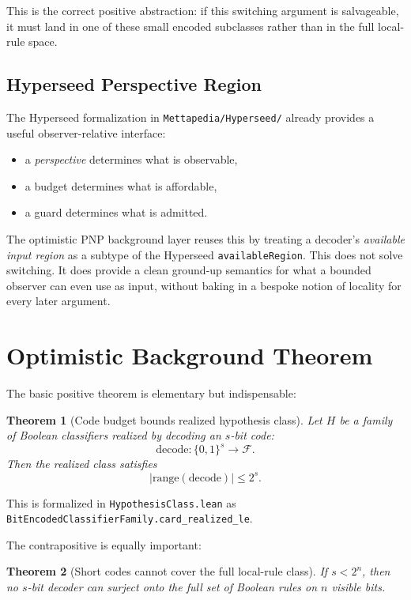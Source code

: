 \documentclass[11pt]{article}
\newtheorem{theorem}{Theorem}[section]
\theoremstyle{remark}
\begin{document}
This is the correct positive abstraction: if this switching argument is salvageable, it must
land in one of these small encoded subclasses rather than in the full local-rule space.

\subsection{Hyperseed Perspective Region}

The Hyperseed formalization in \texttt{Mettapedia/Hyperseed/} already provides a useful
observer-relative interface:
\begin{itemize}[leftmargin=1.5em]
  \item a \emph{perspective} determines what is observable,
  \item a budget determines what is affordable,
  \item a guard determines what is admitted.
\end{itemize}

The optimistic PNP background layer reuses this by treating a decoder's \emph{available
input region} as a subtype of the Hyperseed \texttt{availableRegion}.  This does not solve
switching.  It does provide a clean ground-up semantics for what a bounded observer can even
use as input, without baking in a bespoke notion of locality for every later argument.

\section{Optimistic Background Theorem}

The basic positive theorem is elementary but indispensable:

\begin{theorem}[Code budget bounds realized hypothesis class]
Let \(H\) be a family of Boolean classifiers realized by decoding an \(s\)-bit code:
\[
  \mathrm{decode} : \{0,1\}^s \to \mathcal{F}.
\]
Then the realized class satisfies
\[
  |\mathrm{range}(\mathrm{decode})| \le 2^s.
\]
\end{theorem}

\noindent
This is formalized in \texttt{HypothesisClass.lean} as
\texttt{BitEncodedClassifierFamily.card\_realized\_le}.

The contrapositive is equally important:

\begin{theorem}[Short codes cannot cover the full local-rule class]
If \(s < 2^n\), then no \(s\)-bit decoder can surject onto the full set of Boolean rules on
\(n\) visible bits.
\end{theorem}
\end{document}
